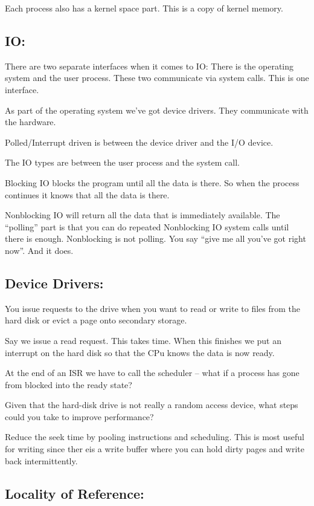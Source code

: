 \documentclass[10pt,\jkfside,a4paper]{article}
\begin{document}
Each process also has a kernel space part. This is a copy of kernel memory. 

\subsection*{IO:}

There are two separate interfaces when it comes to IO:
There is the operating system and the user process. These two communicate via system calls. This is 
one interface.

As part of the operating system we've got device drivers. They communicate with the hardware. 

Polled/Interrupt driven is between the device driver and the I/O device. 

The IO types are between the user process and the system call. 

Blocking IO blocks the program until all the data is there. So when the process continues it knows that all the data is there.

Nonblocking IO will return all the data that is immediately available. The ``polling'' part is 
that you can do repeated Nonblocking IO system calls until there is enough. Nonblocking is not 
polling. You say ``give me all you've got right now''. And it does.

\subsection*{Device Drivers:}

You issue requests to the drive when you want to read or write to files from the hard disk or 
evict a page onto secondary storage.

Say we issue a read request. This takes time. When this finishes we put an interrupt on the 
hard disk so that the CPu knows the data is now ready.

At the end of an ISR we have to call the scheduler -- what if a process has gone from blocked 
into the ready state?

Given that the hard-disk drive is not really a random access device, what steps
could you take to improve performance?

Reduce the seek time by pooling instructions and scheduling. 
This is most useful for writing since ther eis a write buffer where you can hold dirty pages and write back 
intermittently.

\subsection*{Locality of Reference:}
\end{document}

